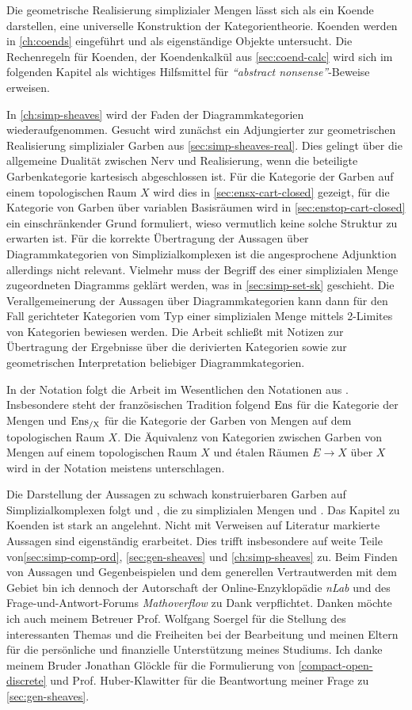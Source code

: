 Die geometrische Realisierung simplizialer Mengen lässt sich als ein
Koende darstellen, eine universelle Konstruktion der
Kategorientheorie. Koenden werden in \autoref{ch:coends} eingeführt
und als eigenständige Objekte untersucht. Die Rechenregeln für
Koenden, der Koendenkalkül aus \autoref{sec:coend-calc} wird sich im
folgenden Kapitel als wichtiges Hilfsmittel für \emph{``abstract
  nonsense''}-Beweise erweisen.

In \autoref{ch:simp-sheaves} wird der Faden der Diagrammkategorien
wiederaufgenommen. Gesucht wird zunächst ein Adjungierter zur
geometrischen Realisierung simplizialer Garben aus
\autoref{sec:simp-sheaves-real}. Dies gelingt über die allgemeine
Dualität zwischen Nerv und Realisierung, wenn die beteiligte
Garbenkategorie kartesisch abgeschlossen ist.  Für die Kategorie der
Garben auf einem topologischen Raum $X$ wird dies in
\autoref{sec:ensx-cart-closed} gezeigt, für die Kategorie von Garben
über variablen Basisräumen wird in \autoref{sec:enstop-cart-closed}
ein einschränkender Grund formuliert, wieso vermutlich keine solche
Struktur zu erwarten ist. Für die korrekte Übertragung der Aussagen
über Diagrammkategorien von Simplizialkomplexen ist die angesprochene
Adjunktion allerdings nicht relevant. Vielmehr muss der Begriff des
einer simplizialen Menge zugeordneten Diagramms geklärt werden, was in
\autoref{sec:simp-set-sk} geschieht. Die Verallgemeinerung der
Aussagen über Diagrammkategorien kann dann für den Fall gerichteter
Kategorien vom Typ einer simplizialen Menge mittels 2-Limites von
Kategorien bewiesen werden. Die Arbeit schließt mit Notizen zur
Übertragung der Ergebnisse über die derivierten Kategorien sowie zur
geometrischen Interpretation beliebiger Diagrammkategorien.

In der Notation folgt die Arbeit im Wesentlichen den Notationen aus
\cite{TG}. Insbesondere steht der französischen Tradition folgend
$\operatorname{Ens}$ für die Kategorie der Mengen und $\operatorname{Ens_{/X}}$ für die Kategorie der
Garben von Mengen auf dem topologischen Raum $X$. Die Äquivalenz von
Kategorien zwischen Garben von Mengen auf einem topologischen Raum $X$
und étalen Räumen $E \to X$ über $X$ wird in der Notation meistens
unterschlagen.

Die Darstellung der Aussagen zu schwach konstruierbaren Garben auf
Simplizialkomplexen folgt \cite{KS} und \cite{WS}, die zu simplizialen
Mengen \cite{GJ} und \cite{GM}. Das Kapitel zu Koenden ist stark an
\cite{Lore} angelehnt. Nicht mit Verweisen auf Literatur markierte
Aussagen sind eigenständig erarbeitet. Dies trifft insbesondere auf
weite Teile von\autoref{sec:simp-comp-ord}, \autoref{sec:gen-sheaves}
und \autoref{ch:simp-sheaves} zu. Beim Finden von Aussagen und
Gegenbeispielen und dem generellen Vertrautwerden mit dem Gebiet bin
ich dennoch der Autorschaft der Online-Enzyklopädie \emph{nLab} und
des Frage-und-Antwort-Forums \emph{Mathoverflow} zu Dank
verpflichtet. Danken möchte ich auch meinem Betreuer Prof. Wolfgang
Soergel für die Stellung des interessanten Themas und die Freiheiten
bei der Bearbeitung und meinen Eltern für die persönliche und
finanzielle Unterstützung meines Studiums. Ich danke meinem Bruder
Jonathan Glöckle für die Formulierung von \ref{compact-open-discrete}
und Prof. Huber-Klawitter für die Beantwortung meiner Frage zu
\autoref{sec:gen-sheaves}.
